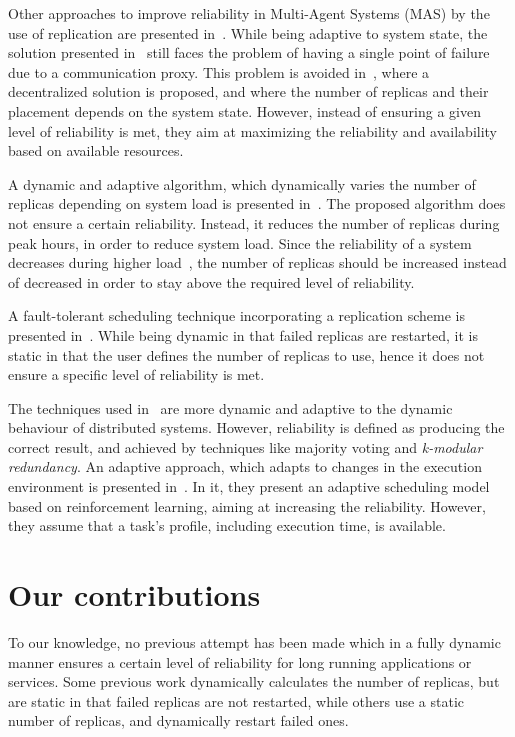 \documentclass{cslthse-msc}
\begin{document}
Other approaches to improve reliability in Multi-Agent Systems (MAS) by the use of replication are presented in~\cite{replicatingAgents, adaptiveMASReplication, adaptiveAgentReplication}. While being adaptive to system state, the solution presented in~\cite{replicatingAgents} still faces the problem of having a single point of failure due to a communication proxy. This problem is avoided in~\cite{adaptiveMASReplication}, where a decentralized solution is proposed, and where the number of replicas and their placement depends on the system state. However, instead of ensuring a given level of reliability is met, they aim at maximizing the reliability and availability based on available resources. %

A dynamic and adaptive algorithm, which dynamically varies the number of replicas depending on system load is presented in~\cite{adaptiveCheckPointAndRep}. The proposed algorithm does not ensure a certain reliability. Instead, it reduces the number of replicas during peak hours, in order to reduce system load. Since the reliability of a system decreases during higher load~\cite{studyOfFailures, implicationsOfFailures}, the number of replicas should be increased instead of decreased in order to stay above the required level of reliability.

A fault-tolerant scheduling technique incorporating a replication scheme is presented in~\cite{faultTolerantSchedPolicy}. While being dynamic in that failed replicas are restarted, it is static in that the user defines the number of replicas to use, hence it does not ensure a specific level of reliability is met.

The techniques used in~\cite{selfAdaptRel, dynAdaptRepl, relModelWebServices} are more dynamic and adaptive to the dynamic behaviour of distributed systems. However, reliability is defined as producing the correct result, and achieved by techniques like majority voting and \emph{k-modular redundancy}. An adaptive approach, which adapts to changes in the execution environment is presented in~\cite{imprRelAdaptRL}. In it, they present an adaptive scheduling model based on reinforcement learning, aiming at increasing the reliability. However, they assume that a task's profile, including execution time, is available.

\section{Our contributions} \label{sec:introduction_contributions}
To our knowledge, no previous attempt has been made which in a fully dynamic manner ensures a certain level of reliability for long running applications or services. Some previous work dynamically calculates the number of replicas, but are static in that failed replicas are not restarted, while others use a static number of replicas, and dynamically restart failed ones.
\end{document}
